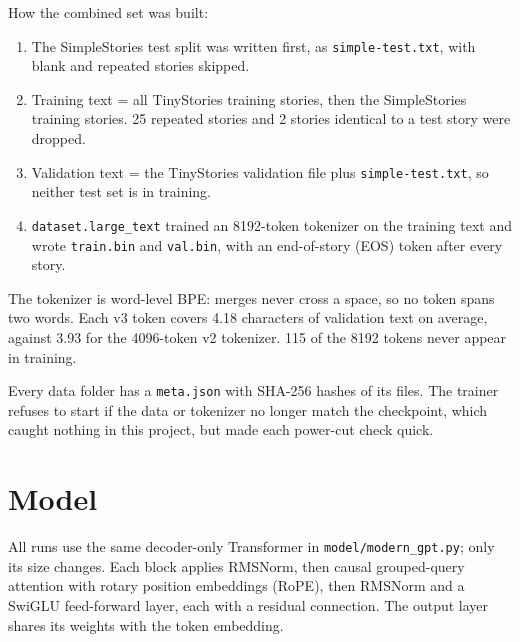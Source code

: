 \documentclass[11pt,a4paper]{article}
\newcommand{\code}[1]{\texttt{#1}}
\begin{document}
How the combined set was built:

\begin{enumerate}
\item The SimpleStories test split was written first, as \code{simple-\allowbreak{}test.\allowbreak{}txt}, with blank and repeated stories skipped.
\item Training text = all TinyStories training stories, then the SimpleStories training stories. 25 repeated stories and 2 stories identical to a test story were dropped.
\item Validation text = the TinyStories validation file plus \code{simple-\allowbreak{}test.\allowbreak{}txt}, so neither test set is in training.
\item \code{dataset.\allowbreak{}large\_\allowbreak{}text} trained an 8192-token tokenizer on the training text and wrote \code{train.\allowbreak{}bin} and \code{val.\allowbreak{}bin}, with an end-of-story (EOS) token after every story.
\end{enumerate}

The tokenizer is word-level BPE: merges never cross a space, so no token spans two words. Each v3 token covers 4.18 characters of validation text on average, against 3.93 for the 4096-token v2 tokenizer. 115 of the 8192 tokens never appear in training.

Every data folder has a \code{meta.\allowbreak{}json} with SHA-256 hashes of its files. The trainer refuses to start if the data or tokenizer no longer match the checkpoint, which caught nothing in this project, but made each power-cut check quick.

\section*{Model}
{}

All runs use the same decoder-only Transformer in \code{model/\allowbreak{}modern\_\allowbreak{}gpt.\allowbreak{}py}; only its size changes. Each block applies RMSNorm, then causal grouped-query attention with rotary position embeddings (RoPE), then RMSNorm and a SwiGLU feed-forward layer, each with a residual connection. The output layer shares its weights with the token embedding.
\end{document}
